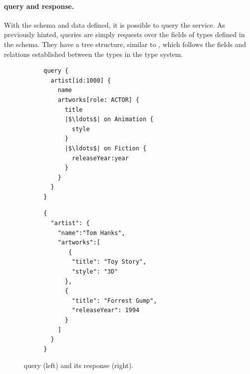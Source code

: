 

\paragraph{\gql query and response.}

With the schema and data defined, it is possible to query the service. 
As previously hinted, \gql queries are simply requests over the fields of types defined in the schema.
They have a tree structure, similar to \json, which follows the fields and relations established between the types
in the type system.

\begin{figure}
\centering
\begin{subfigure}{.25\textwidth}
\begin{verbatim}
query {
  artist[id:1000] {
    name
    artworks[role: ACTOR] {
      title
      |$\ldots$| on Animation {
        style
      }
      |$\ldots$| on Fiction {
        releaseYear:year
      }
    }
  }
}

\end{verbatim}
\label{fig:query_ex}
\end{subfigure}%
\begin{subfigure}{.25\textwidth}
\begin{verbatim}
{
  "artist": {
    "name":"Tom Hanks",
    "artworks":[
       {
        "title": "Toy Story",
        "style": "3D"
      },
      {
        "title": "Forrest Gump",
        "releaseYear": 1994
      }
    ]
  }
}
\end{verbatim}
\label{fig:response_ex}
\end{subfigure}
\caption{\gql query (left) and its response (right).}
\label{fig:qres_ex}
\end{figure}


